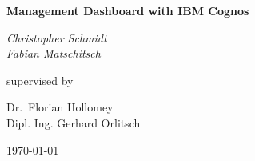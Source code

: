 \documentclass[a4paper]{article}
\begin{document}
	\begin{titlepage}
	
	\centering
	
	{\huge\bfseries Management Dashboard with IBM Cognos\par}
	\vspace{2cm}
	
	
	\begin{figure}
    \hspace{5cm}
	\end{figure}
	\vspace{1.5cm}
	
	{\Large\itshape Christopher Schmidt\\
	Fabian Matschitsch\par}
	\vfill
	supervised by\par
	Dr.~Florian Hollomey\\
	Dipl. Ing. Gerhard Orlitsch
	\vfill
	{\large \today\par}	
	
	\end{titlepage}

	\tableofcontents
	\newpage
\end{document}
